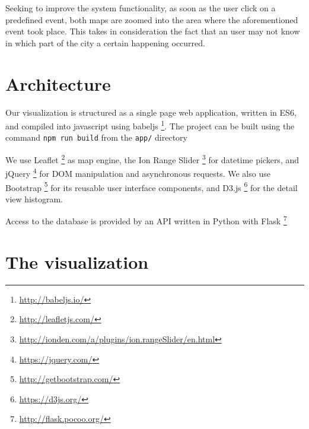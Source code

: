 \documentclass[11pt]{article}%
\begin{document}
Seeking to improve the system functionality, as soon as the user click on a predefined event, both maps are zoomed into the area where the aforementioned event took place. This takes in consideration the fact that an user may not know in which part of the city a certain happening occurred.
                       
\section{Architecture}
Our visualization is structured as a single page web application, written in ES6, and compiled into javascript using babeljs \footnote{\url{http://babeljs.io/}}. The project can be built using the command \texttt{npm run build} from the \texttt{app/} directory

We use Leaflet \footnote{\url{http://leafletjs.com/}} as map engine, the Ion Range Slider \footnote{\url{http://ionden.com/a/plugins/ion.rangeSlider/en.html}} for datetime pickers, and jQuery \footnote{\url{https://jquery.com/}} for DOM manipulation and asynchronous requests. We also use Bootstrap \footnote{\url{http://getbootstrap.com/}} for its reusable user interface components, and D3.js \footnote{\url{https://d3js.org/}} for the detail view histogram.

Access to the database is provided by an API written in Python with Flask \footnote{\url{http://flask.pocoo.org/}}

\section{The visualization}
\end{document}

